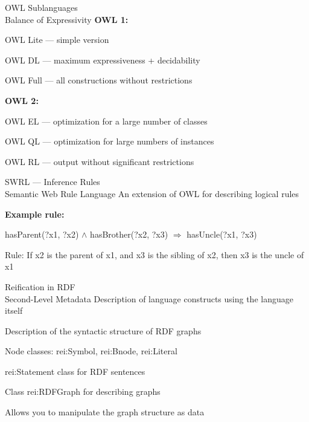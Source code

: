 \begin{frame}{OWL Sublanguages\\Balance of Expressivity}
	\topline
	\justifying
	\textbf{OWL 1:}
	\begin{textitemize}
		\item OWL Lite --- simple version
		\item OWL DL --- maximum expressiveness + decidability
		\item OWL Full --- all constructions without restrictions
	\end{textitemize}
	
	\textbf{OWL 2:}
	\begin{textitemize}
		\item OWL EL --- optimization for a large number of classes
		\item OWL QL --- optimization for large numbers of instances
		\item OWL RL --- output without significant restrictions
	\end{textitemize}
\end{frame}

\begin{frame}{SWRL --- Inference Rules\\Semantic Web Rule Language}
	\topline
	\justifying
	An extension of OWL for describing logical rules
	
	\vspace{0.5cm}
	\textbf{Example rule:}
	
	hasParent(?x1, ?x2) $\land$ hasBrother(?x2, ?x3) $\Rightarrow$ hasUncle(?x1, ?x3)
	
	\vspace{0.5cm}
	Rule: If x2 is the parent of x1, and x3 is the sibling of x2, then x3 is the uncle of x1
\end{frame}

\begin{frame}{Reification in RDF\\Second-Level Metadata}
	\topline
	\justifying
	Description of language constructs using the language itself
	
	\begin{textitemize}
		\item Description of the syntactic structure of RDF graphs
		\item Node classes: rei:Symbol, rei:Bnode, rei:Literal
		\item rei:Statement class for RDF sentences
		\item Class rei:RDFGraph for describing graphs
	\end{textitemize}
	
	Allows you to manipulate the graph structure as data
\end{frame}

